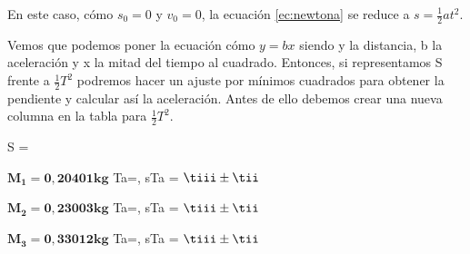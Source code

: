 \documentclass[12pt, a4paper, titlepage]{article}
\begin{document}
  En este caso, cómo $s_0 = 0$ y $v_0 = 0$, la ecuación \ref{ec:newtona} se reduce a $s = \frac{1}{2}at^2$.

  Vemos que podemos poner la ecuación cómo $y = bx$ siendo y la distancia, b la aceleración y x la mitad del tiempo al cuadrado. Entonces, si representamos S frente a $\frac{1}{2}T^2$ podremos hacer un ajuste por mínimos cuadrados para obtener la pendiente y calcular así la aceleración. Antes de ello debemos crear una nueva columna en la tabla para $\frac{1}{2}T^2$.

  \begin{center}
    \vspace{0.6cm}
    \begin{minipage}[H]{0.12\textwidth}
      \centering
      \vspace{0.40cm}
        {S = \Si}
        {\Si}
    \end{minipage}
    \begin{minipage}[H]{0.27\textwidth}
      \centering
      $\mathbf{M_1 = 0,20401kg}$
        {Ta=\tiii, sTa = \tii}
        {$\tiii \pm \tii$}
    \end{minipage}
    \begin{minipage}[H]{0.27\textwidth}
      \centering
      $\mathbf{M_2 = 0,23003kg}$
        {Ta=\tiii, sTa = \tii}
        {$\tiii \pm \tii$}
    \end{minipage}
    \begin{minipage}[H]{0.27\textwidth}
      \centering
      $\mathbf{M_3 = 0,33012kg}$
        {Ta=\tiii, sTa = \tii}
        {$\tiii \pm \tii$}
    \end{minipage}
    \vspace{0.6cm}
  \end{center}
\end{document}
